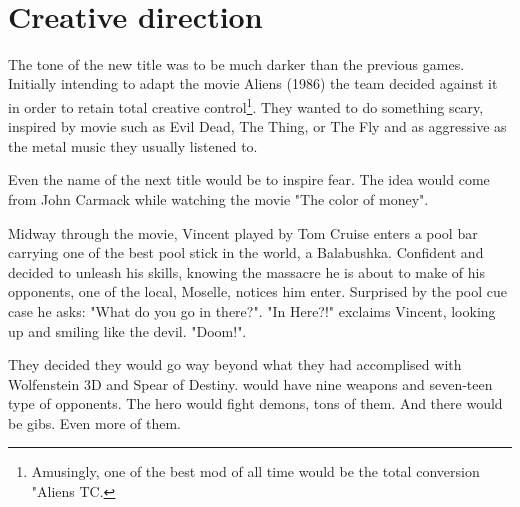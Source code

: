 \\
\par
{}

\section{Creative direction}
The tone of the new title was to be much darker than the previous games. Initially intending to adapt the movie Aliens (1986) the team decided against it in order to retain total creative control\footnote{Amusingly, one of the best mod of all time would be the total conversion "Aliens TC.}. They wanted to do something scary, inspired by movie such as Evil Dead, The Thing, or The Fly and as aggressive as the metal music they usually listened to.\\
\par
Even the name of the next title would be to inspire fear. The idea would come from John Carmack while watching the movie "The color of money".\\ 
\par
Midway through the movie, Vincent played by Tom Cruise enters a pool bar carrying one of the best pool stick in the world, a Balabushka. Confident and decided to unleash his skills, knowing the massacre he is about to make of his opponents, one of the local, Moselle, notices him enter. Surprised by the pool cue case he asks: "What do you go in there?". "In Here?!" exclaims Vincent, looking up and smiling like the devil. "Doom!".\\
\par

\par
{}
\par
They decided they would go way beyond what they had accomplised with Wolfenstein 3D and Spear of Destiny. \doom would have nine weapons and seven-teen type of opponents. The hero would fight demons, tons of them. And there would be gibs. Even more of them.

